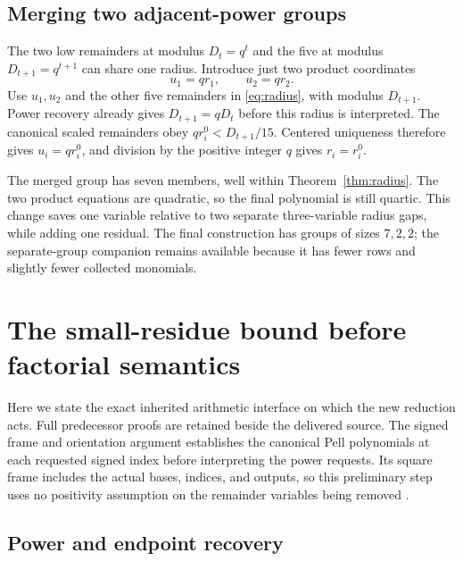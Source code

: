 \documentclass[11pt]{article}
\theoremstyle{remark}
\numberwithin{equation}{section}
\begin{document}
\subsection{Merging two adjacent-power groups}

The two low remainders at modulus $D_t=q^t$ and the five at modulus $D_{t+1}=q^{t+1}$ can share one radius. Introduce just two product coordinates
\[
u_1=qr_1,\qquad u_2=qr_2.
\]
Use $u_1,u_2$ and the other five remainders in \eqref{eq:radius}, with modulus $D_{t+1}$. Power recovery already gives $D_{t+1}=qD_t$ before this radius is interpreted. The canonical scaled remainders obey $q r_i^0<D_{t+1}/15$. Centered uniqueness therefore gives $u_i=qr_i^0$, and division by the positive integer $q$ gives $r_i=r_i^0$.

The merged group has seven members, well within Theorem~\ref{thm:radius}. The two product equations are quadratic, so the final polynomial is still quartic. This change saves one variable relative to two separate three-variable radius gaps, while adding one residual. The final construction has groups of sizes $7,2,2$; the separate-group companion remains available because it has fewer rows and slightly fewer collected monomials.

\section{The small-residue bound before factorial semantics}\label{sec:bootstrap}

Here we state the exact inherited arithmetic interface on which the new reduction acts. Full predecessor proofs are retained beside the delivered source. The signed frame and orientation argument establishes the canonical Pell polynomials at each requested signed index before interpreting the power requests. Its square frame includes the actual bases, indices, and outputs, so this preliminary step uses no positivity assumption on the remainder variables being removed \cite{cofinal}.

\subsection{Power and endpoint recovery}
\end{document}
